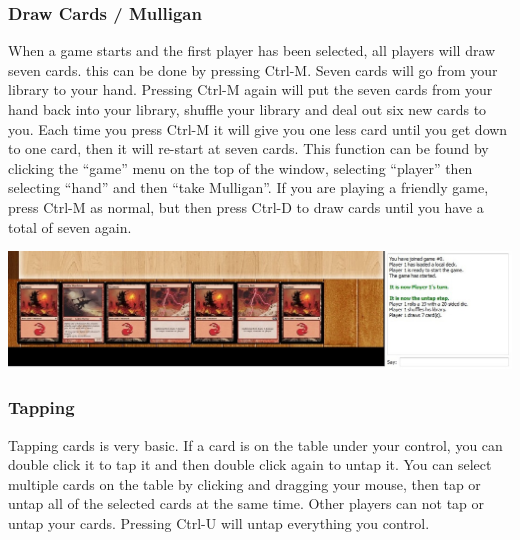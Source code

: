 \documentclass[a4paper]{scrbook}
\begin{document}
\subsubsection{Draw Cards / Mulligan}
When a game starts and the first player has been selected, all players will draw seven cards. this can be done by pressing Ctrl-M. Seven cards will go from your library to your hand. Pressing Ctrl-M again will put the seven cards from your hand back into your library, shuffle your library and deal out six new cards to you. Each time you press Ctrl-M it will give you one less card until you get down to one card, then it will re-start at seven cards. This function can be found by clicking the “game” menu on the top of the window, selecting “player” then selecting “hand” and then “take Mulligan”. If you are playing a friendly game, press Ctrl-M as normal, but then press Ctrl-D to draw cards until you have a total of seven again.
\begin{center}
\includegraphics[scale=0.5]{pics/fetchfe20}
\end{center}


\subsubsection{Tapping}
Tapping cards is very basic. If a card is on the table under your control, you can double click it to tap it and then double click again to untap it. You can select multiple cards on the table by clicking and dragging your mouse, then tap or untap all of the selected cards at the same time. Other players can not tap or untap your cards. Pressing Ctrl-U will untap everything you control.
\end{document}
